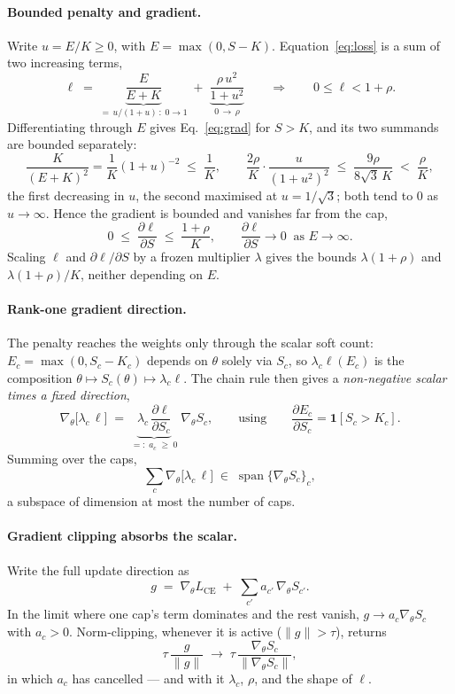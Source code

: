 \documentclass[10pt]{article}
\begin{document}
{
\paragraph{Bounded penalty and gradient.}
Write $u=E/K\ge 0$, with $E=\max(0,S-K)$. Equation~\eqref{eq:loss} is a sum of two
increasing terms,
\[
\ell \;=\;
\underbrace{\frac{E}{E+K}}_{=\,u/(1+u)\,:\;0\to 1}
\;+\;
\underbrace{\frac{\rho\,u^{2}}{1+u^{2}}}_{0\,\to\,\rho}
\qquad\Longrightarrow\qquad
0\le\ell<1+\rho .
\]
Differentiating through $E$ gives Eq.~\eqref{eq:grad} for $S>K$, and its two summands are
bounded separately:
\[
\frac{K}{(E+K)^{2}}=\frac{1}{K}(1+u)^{-2}\;\le\;\frac{1}{K},
\qquad
\frac{2\rho}{K}\cdot\frac{u}{(1+u^{2})^{2}}\;\le\;\frac{9\rho}{8\sqrt3\,K}\;<\;\frac{\rho}{K},
\]
the first decreasing in $u$, the second maximised at $u=1/\sqrt3$; both tend to $0$ as
$u\to\infty$. Hence the gradient is bounded and vanishes far from the cap,
\[
0\;\le\;\frac{\partial\ell}{\partial S}\;\le\;\frac{1+\rho}{K},
\qquad
\frac{\partial\ell}{\partial S}\to 0 \ \text{ as } E\to\infty .
\]
Scaling $\ell$ and $\partial\ell/\partial S$ by a frozen multiplier $\lambda$ gives the
bounds $\lambda(1+\rho)$ and $\lambda(1+\rho)/K$, neither depending on $E$.
}

{
\paragraph{Rank-one gradient direction.}
The penalty reaches the weights only through the scalar soft count:
$E_c=\max(0,S_c-K_c)$ depends on $\theta$ solely via $S_c$, so
$\lambda_c\ell(E_c)$ is the composition
$\theta\mapsto S_c(\theta)\mapsto\lambda_c\ell$. The chain rule then gives a
\emph{non-negative scalar times a fixed direction},
\[
\nabla_\theta\bigl[\lambda_c\,\ell\bigr]
\;=\;
\underbrace{\lambda_c\,\frac{\partial\ell}{\partial S_c}}_{=:\;a_c\;\ge\;0}
\;\nabla_\theta S_c ,
\qquad\text{using}\qquad
\frac{\partial E_c}{\partial S_c}=\mathbf 1[S_c>K_c] .
\]
Summing over the caps,
\[
\sum_c \nabla_\theta\bigl[\lambda_c\,\ell\bigr]
\;\in\;
\operatorname{span}\{\nabla_\theta S_c\}_c ,
\]
a subspace of dimension at most the number of caps.
}

{
\paragraph{Gradient clipping absorbs the scalar.}
Write the full update direction as
\[
g \;=\; \nabla_\theta L_{\text{CE}} \;+\; \sum_{c'} a_{c'}\,\nabla_\theta S_{c'} .
\]
In the limit where one cap's term dominates and the rest vanish, $g\to a_c\nabla_\theta S_c$
with $a_c>0$. Norm-clipping, whenever it is active ($\lVert g\rVert>\tau$), returns
\[
\tau\,\frac{g}{\lVert g\rVert}
\;\longrightarrow\;
\tau\,\frac{\nabla_\theta S_c}{\lVert\nabla_\theta S_c\rVert},
\]
in which $a_c$ has cancelled --- and with it $\lambda_c$, $\rho$, and the shape of $\ell$.
}
\end{document}
